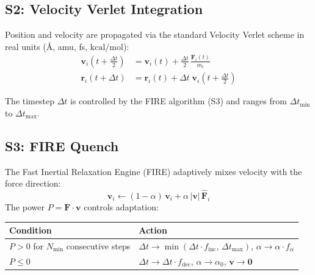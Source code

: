 \documentclass[11pt, a4paper, oneside]{article}
\newcommand{\Ang}{\text{\AA}}
\newcommand{\kcalmol}{\text{kcal/mol}}
\begin{document}
\subsection{S2: Velocity Verlet Integration}
\label{sec:s2-verlet}

Position and velocity are propagated via the standard Velocity Verlet
scheme in real units ($\Ang$, amu, fs, $\kcalmol$):
%
\begin{align}
  \mathbf{v}_i\!\left(t + \tfrac{\Delta t}{2}\right)
    &= \mathbf{v}_i(t) + \frac{\Delta t}{2}\,\frac{\mathbf{F}_i(t)}{m_i}
  \label{eq:verlet-v-half} \\[6pt]
  \mathbf{r}_i(t + \Delta t)
    &= \mathbf{r}_i(t) + \Delta t\;\mathbf{v}_i\!\left(t + \tfrac{\Delta t}{2}\right)
  \label{eq:verlet-r}
\end{align}

The timestep $\Delta t$ is controlled by the FIRE algorithm (S3) and
ranges from $\Delta t_{\min}$ to $\Delta t_{\max}$.

\subsection{S3: FIRE Quench}
\label{sec:s3-fire}

The Fast Inertial Relaxation Engine (FIRE) adaptively mixes velocity
with the force direction:
%
\begin{equation}
  \mathbf{v}_i \leftarrow (1 - \alpha)\,\mathbf{v}_i
    + \alpha\,|\mathbf{v}|\,\hat{\mathbf{F}}_i
  \label{eq:fire-mix}
\end{equation}
%
The power $P = \mathbf{F} \cdot \mathbf{v}$ controls adaptation:
%
\begin{center}
\begin{tabular}{ll}
  \toprule
  \textbf{Condition} & \textbf{Action} \\
  \midrule
  $P > 0$ for $N_{\min}$ consecutive steps & $\Delta t \to \min(\Delta t \cdot f_{\text{inc}},\, \Delta t_{\max})$,\; $\alpha \to \alpha \cdot f_\alpha$ \\
  $P \leq 0$ & $\Delta t \to \Delta t \cdot f_{\text{dec}}$,\; $\alpha \to \alpha_0$,\; $\mathbf{v} \to \mathbf{0}$ \\
  \bottomrule
\end{tabular}
\end{center}
\end{document}
